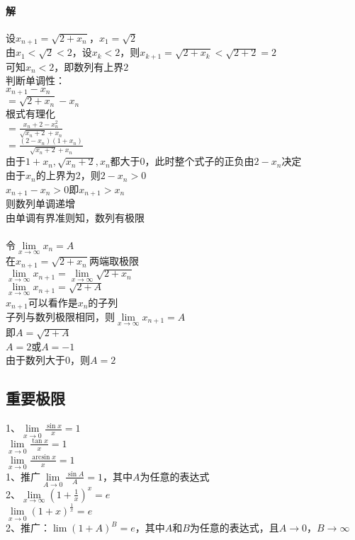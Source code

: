 \documentclass{article}
\begin{document}
\begin{flushleft}
	\paragraph{解}
	设$x_{n+1}=\sqrt{2+x_n}$，$x_1=\sqrt{2}$\\
	由$x_1<\sqrt{2}<2$，设$x_k<2$，则$x_{k+1}=\sqrt{2+x_k}<\sqrt{2+2}=2$\\
	可知$x_n<2$，即数列有上界$2$\\
	判断单调性：\\
	$x_{n+1}-x_n$\\
	$=\sqrt{2+x_n}-x_n$\\
	根式有理化\\
	$=\frac{x_n+2-x_n^2}{\sqrt{x_n+2}+x_n}$\\
	$=\frac{(2-x_n)(1+x_n)}{\sqrt{x_n+2}+x_n}$\\
	由于$1+x_n, \sqrt{x_n+2}, x_n$都大于0，此时整个式子的正负由$2-x_n$决定\\
	由于$x_n$的上界为$2$，则$2-x_n>0$\\
	$x_{n+1}-x_n>0$即$x_{n+1}>x_n$\\
	则数列单调递增\\
	由单调有界准则知，数列有极限\\
	~\\
	令$\lim\limits_{x\to\infty}x_n=A$\\
	在$x_{n+1}=\sqrt{2+x_n}$两端取极限\\
	$\lim\limits_{x\to\infty}x_{n+1}=\lim\limits_{x\to\infty}\sqrt{2+x_n}$\\
	$\lim\limits_{x\to\infty}x_{n+1}=\sqrt{2+A}$\\
	$x_{n+1}$可以看作是$x_n$的子列\\
	子列与数列极限相同，则$\lim\limits_{x\to\infty}x_{n+1}=A$\\
	即$A=\sqrt{2+A}$\\
	$A=2$或$A=-1$\\
	由于数列大于0，则$A=2$\\
	
	\subsection{重要极限}
	1、$\lim\limits_{x\to 0} \frac{\sin x}{x}=1$\\
	\qquad $\lim\limits_{x\to 0} \frac{\tan x}{x}=1$\\
	\qquad $\lim\limits_{x\to 0} \frac{\arcsin x}{x}=1$\\
	1、推广$\lim\limits_{A\to 0} \frac{\sin A}{A}=1$，其中$A$为任意的表达式\\
	2、$\lim\limits_{x\to \infty} (1+\frac{1}{x})^x=e$\\
	\qquad $\lim\limits_{x\to 0} (1+x)^{\frac{1}{x}}=e$\\
	2、推广：$\lim (1+A)^{B}=e$，其中$A$和$B$为任意的表达式，且$A\to 0$，$B\to\infty$\\
	

\end{flushleft}
\end{document}
